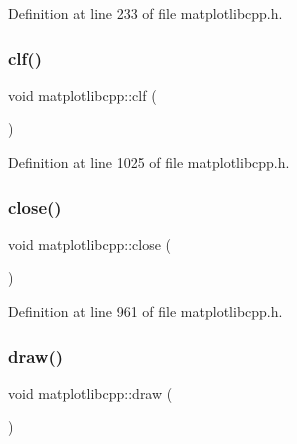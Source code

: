 Definition at line 233 of file matplotlibcpp.\+h.

\mbox{\label{namespacematplotlibcpp_adea4113b0ff7f393e18f1a99eb7e1718}} 
\subsubsection{\texorpdfstring{clf()}{clf()}}
{\footnotesize\ttfamily void matplotlibcpp\+::clf (\begin{DoxyParamCaption}{ }\end{DoxyParamCaption})\hspace{0.3cm}{\ttfamily [inline]}}



Definition at line 1025 of file matplotlibcpp.\+h.

\mbox{\label{namespacematplotlibcpp_a62aaaf872c41a9d1b71add44c0cc0447}} 
\subsubsection{\texorpdfstring{close()}{close()}}
{\footnotesize\ttfamily void matplotlibcpp\+::close (\begin{DoxyParamCaption}{ }\end{DoxyParamCaption})\hspace{0.3cm}{\ttfamily [inline]}}



Definition at line 961 of file matplotlibcpp.\+h.

\mbox{\label{namespacematplotlibcpp_acd9fc5bb7916c735390c2056214b12be}} 
\subsubsection{\texorpdfstring{draw()}{draw()}}
{\footnotesize\ttfamily void matplotlibcpp\+::draw (\begin{DoxyParamCaption}{ }\end{DoxyParamCaption})\hspace{0.3cm}{\ttfamily [inline]}}



